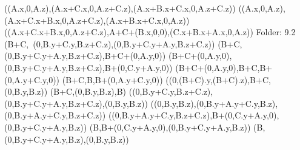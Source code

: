 \left(\left(A.x,0,A.z\right),\left(A.x+C.x,0,A.z+C.z\right),\left(A.x+B.x+C.x,0,A.z+C.z\right)\right)
\left(\left(A.x,0,A.z\right),\left(A.x+C.x+B.x,0,A.z+C.z\right),\left(A.x+B.x+C.x,0,A.z\right)\right)
\left(\left(A.x+C.x+B.x,0,A.z+C.z\right),A+C+\left(B.x,0,0\right),\left(C.x+B.x+A.x,0,A.z\right)\right)
Folder: 9.2
\left(B+C,\ \left(0,B.y+C.y,B.z+C.z\right),\left(0,B.y+C.y+A.y,B.z+C.z\right)\right)
\left(B+C,\left(0,B.y+C.y+A.y,B.z+C.z\right),B+C+\left(0,A.y,0\right)\right)
\left(B+C+\left(0,A.y,0\right),\left(0,B.y+C.y+A.y,B.z+C.z\right),B+\left(0,C.y+A.y,0\right)\right)
\left(B+C+\left(0,A.y,0\right),B+C,B+\left(0,A.y+C.y,0\right)\right)
\left(B+C,B,B+\left(0,A.y+C.y,0\right)\right)
\left(\left(0,\left(B+C\right).y,\left(B+C\right).z\right),B+C,\left(0,B.y,B.z\right)\right)
\left(B+C,\left(0,B.y,B.z\right),B\right)
\left(\left(0,B.y+C.y,B.z+C.z\right),\left(0,B.y+C.y+A.y,B.z+C.z\right),\left(0,B.y,B.z\right)\right)
\left(\left(0,B.y,B.z\right),\left(0,B.y+A.y+C.y,B.z\right),\left(0,B.y+A.y+C.y,B.z+C.z\right)\right)
\left(\left(0,B.y+A.y+C.y,B.z+C.z\right),B+\left(0,C.y+A.y,0\right),\left(0,B.y+C.y+A.y,B.z\right)\right)
\left(B,B+\left(0,C.y+A.y,0\right),\left(0,B.y+C.y+A.y,B.z\right)\right)
\left(B,\left(0,B.y+C.y+A.y,B.z\right),\left(0,B.y,B.z\right)\right)
